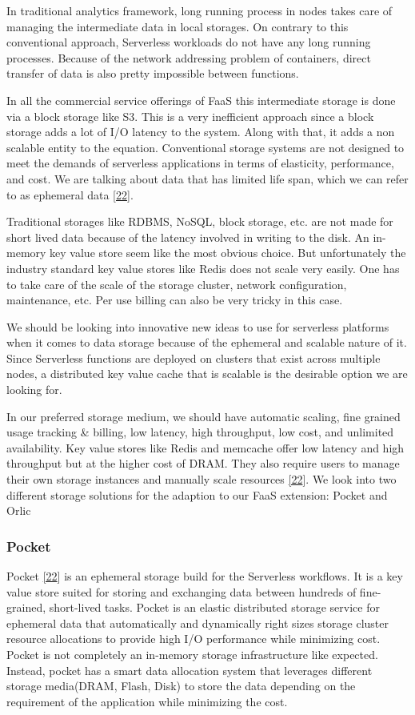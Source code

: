 \documentclass[12pt,titlepage]{article}
\begin{document}
In traditional analytics framework, long running process in nodes takes care of
managing the intermediate data in local storages. On contrary to this
conventional approach, Serverless workloads do not have any long running
processes. Because of the network addressing problem of containers, direct
transfer of data is also pretty impossible between functions.

In all the commercial service offerings of FaaS this intermediate storage is
done via a block storage like S3. This is a very inefficient approach since a
block storage adds a lot of I/O latency to the system. Along with that, it adds
a non scalable entity to the equation. Conventional storage systems are not
designed to meet the demands of serverless applications in terms of elasticity,
performance, and cost. We are talking about data that has limited life span,
which we can refer to as ephemeral data \hyperref[ref:22]{[22}].

Traditional storages like RDBMS, NoSQL, block storage, etc. are not made for
short lived data because of the latency involved in writing to the disk. An
in-memory key value store seem like the most obvious choice. But unfortunately
the industry standard key value stores like Redis does not scale very easily. One
has to take care of the scale of the storage cluster, network configuration,
maintenance, etc. Per use billing can also be very tricky in this case.

We should be looking into innovative new ideas to use for serverless platforms when
it comes to data storage because of the ephemeral and scalable nature of it.
Since Serverless functions are deployed on clusters that exist across multiple
nodes, a distributed key value cache that is scalable is the desirable option we
are looking for.

In our preferred storage medium, we should have automatic scaling, fine grained
usage tracking \& billing, low latency, high throughput, low cost, and unlimited
availability. Key value stores like Redis and memcache offer low latency and
high throughput but at the higher cost of DRAM. They also require users to
manage their own storage instances and manually scale resources \hyperref[ref:22]{[22}]. We look into
two different storage solutions for the adaption to our FaaS extension: Pocket and Orlic

\subsubsection{Pocket}
\label{sec:org6cb6a78}
Pocket \hyperref[ref:22]{[22}] is an ephemeral storage build for the Serverless workflows.
It is a key value store suited for storing and exchanging data between hundreds
of fine-grained, short-lived tasks. Pocket is an elastic distributed storage
service for ephemeral data that automatically and dynamically  right sizes
storage cluster resource allocations to provide high I/O performance while
minimizing cost. Pocket is not completely an in-memory storage
infrastructure like expected. Instead, pocket has a smart data allocation system
that leverages different storage media(DRAM, Flash, Disk) to store the data
depending on the requirement of the application while minimizing the cost.
\end{document}
